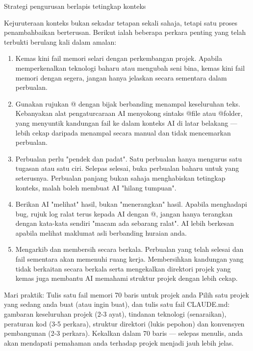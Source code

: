 \begin{center}\small\color{gray}Strategi pengurusan berlapis tetingkap konteks\end{center}


Kejuruteraan konteks bukan sekadar tetapan sekali sahaja, tetapi satu proses penambahbaikan berterusan. Berikut ialah beberapa perkara penting yang telah terbukti berulang kali dalam amalan:

\begin{enumerate}
  \item Kemas kini fail memori selari dengan perkembangan projek. Apabila memperkenalkan teknologi baharu atau mengubah seni bina, kemas kini fail memori dengan segera, jangan hanya jelaskan secara sementara dalam perbualan.
  \item Gunakan rujukan @ dengan bijak berbanding menampal keseluruhan teks. Kebanyakan alat pengaturcaraan AI menyokong sintaks @file atau @folder, yang menyuntik kandungan fail ke dalam konteks AI di latar belakang — lebih cekap daripada menampal secara manual dan tidak mencemarkan perbualan.
  \item Perbualan perlu "pendek dan padat". Satu perbualan hanya mengurus satu tugasan atau satu ciri. Selepas selesai, buka perbualan baharu untuk yang seterusnya. Perbualan panjang bukan sahaja menghabiskan tetingkap konteks, malah boleh membuat AI "hilang tumpuan".
  \item Berikan AI "melihat" hasil, bukan "menerangkan" hasil. Apabila menghadapi bug, rujuk log ralat terus kepada AI dengan @, jangan hanya terangkan dengan kata-kata sendiri "macam ada sebarang ralat". AI lebih berkesan apabila melihat maklumat asli berbanding huraian anda.
  \item Mengarkib dan membersih secara berkala. Perbualan yang telah selesai dan fail sementara akan memenuhi ruang kerja. Membersihkan kandungan yang tidak berkaitan secara berkala serta mengekalkan direktori projek yang kemas juga membantu AI memahami struktur projek dengan lebih cekap.
\end{enumerate}

\begin{tcbpractice}{Mari praktik: Tulis satu fail memori 70 baris untuk projek anda}
Pilih satu projek yang sedang anda buat (atau ingin buat), dan tulis satu fail CLAUDE.md: gambaran keseluruhan projek (2-3 ayat), tindanan teknologi (senaraikan), peraturan kod (3-5 perkara), struktur direktori (lukis pepohon) dan konvensyen pembangunan (2-3 perkara). Kekalkan dalam 70 baris — selepas menulis, anda akan mendapati pemahaman anda terhadap projek menjadi jauh lebih jelas.

\end{tcbpractice}

